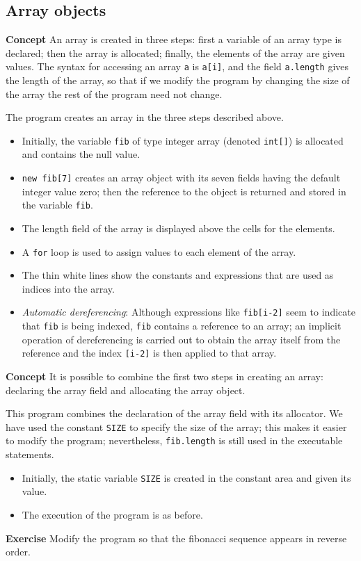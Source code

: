 \subsection{Array objects}\label{array.01}

\textbf{Concept} An array is created in three steps: first a variable of 
an array type is declared; then the array is allocated; finally, the 
elements of the array are given values. The syntax for accessing an array 
\texttt{a} is \texttt{a[i]}, and the field \texttt{a.length} gives the 
length of the array, so that if we modify the program by changing the size 
of the array the rest of the program need not change.


The program creates an array in the three steps described above.

\begin{itemize}
\item Initially, the variable \texttt{fib} of type integer array (denoted 
\texttt{int[]}) is allocated and contains the null value.
\item \texttt{new fib[7]} creates an array object with its seven fields having the default 
integer value zero; then the reference to the object is returned and 
stored in the variable \texttt{fib}.
\item The length field of the array is displayed above the cells for the elements.
\item A \texttt{for} loop is used to assign values to each element of the 
array.
\item The thin white lines show the constants and expressions that are used
as indices into the array.
\item \emph{Automatic dereferencing}: 
Although expressions like \texttt{fib[i-2]} seem to indicate that 
\texttt{fib} is being indexed, \texttt{fib} contains a reference to an array;
an implicit operation of dereferencing is carried out to obtain the
array itself from the reference and the index \texttt{[i-2]} is then
applied to that array.
\end{itemize}

\textbf{Concept} It is possible to combine the first two steps in creating an array: 
declaring the array field and allocating the array object.


This program combines the declaration of the
array field with its allocator. We have used the constant \texttt{SIZE} to 
specify the size of the array; this makes it easier to modify 
the program; nevertheless, \texttt{fib.length} is still used in the 
executable statements.
\begin{itemize}
  \item Initially, the static variable \texttt{SIZE} is created in the constant
  area and given its value.
  \item The execution of the program is as before.
\end{itemize}

\textbf{Exercise} Modify the program so that the fibonacci sequence appears in
reverse order.
